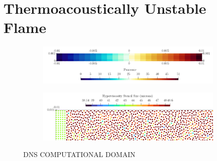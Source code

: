



\section{Thermoacoustically Unstable Flame}

\begin{figure}[t]
\centering
    \begin{subfigure}{0.99\textwidth}
    \centering
    \includegraphics[scale=0.25]{assets/graphs/flame-sim-discretisation.png}
    \caption{}
    \label{fig:disc1}
    \end{subfigure}

\vspace*{0.5em}

    \begin{subfigure}{0.99\textwidth}
    \centering
    \includegraphics[scale=0.25]{assets/graphs/flame-sim-discretisation_zoom.png}
    \caption{}
    \label{fig:disc2}
    \end{subfigure}
\caption{DNS COMPUTATIONAL DOMAIN}
\label{fig:disc}
\end{figure}




